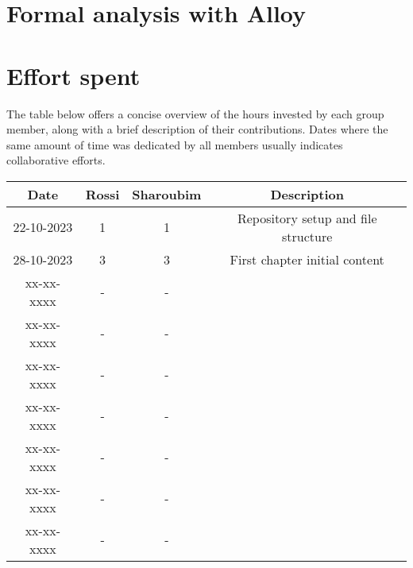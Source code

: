 \documentclass[12pt, a4paper]{report}
\begin{document}
\newpage 

\chapter{Formal analysis with Alloy}

\newpage 

\chapter{Effort spent}
    The table below offers a concise overview of the hours invested by each group member, along with a brief description of their contributions. 
    Dates where the same amount of time was dedicated by all members usually indicates collaborative efforts.
    \begin{table}[H]
        \centering
        \begin{tabular}{cccc}
            \textbf{Date}   & \textbf{Rossi}            & \textbf{Sharoubim}            & \textbf{Description}                          \\ \hline
            22-10-2023      & 1                         & 1                             & Repository setup and file structure           \\ 
            28-10-2023      & 3                         & 3                             & First chapter initial content                 \\ 
            xx-xx-xxxx      & -                         & -                             &                                               \\
            xx-xx-xxxx      & -                         & -                             &                                               \\
            xx-xx-xxxx      & -                         & -                             &                                               \\
            xx-xx-xxxx      & -                         & -                             &                                               \\
            xx-xx-xxxx      & -                         & -                             &                                               \\
            xx-xx-xxxx      & -                         & -                             &                                               \\
            xx-xx-xxxx      & -                         & -                             &                                               \\

\end{tabular}
\end{table}
\end{document}
